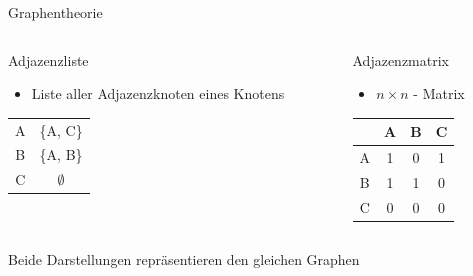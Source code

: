 \documentclass[aspectratio=169]{beamer}
\begin{document}
\begin{frame}{Graphentheorie}
    \vspace{0.5cm}
    \begin{columns}
        \begin{column}{0.5\textwidth}
            \centering \Large Adjazenzliste \normalsize
            \begin{itemize}
                \item Liste aller Adjazenzknoten eines Knotens
            \end{itemize}
            \begin{table}[]
                \centering
                \begin{tabular}{c|c}
                    A & \{A, C\} \\
                    B & \{A, B\} \\
                    C & $\emptyset$
                \end{tabular}
            \end{table}
        \end{column}
        \pause
        \vline
        \begin{column}{0.5\textwidth}
            \centering \Large Adjazenzmatrix \normalsize
            \begin{itemize}
                \item $n \times n$ - Matrix
            \end{itemize}
            \begin{table}[]
                \centering
                \begin{tabular}{c|c c c}
                     & A & B & C \\
                     \hline
                    A & 1 & 0 & 1 \\
                    B & 1 & 1 & 0 \\
                    C & 0 & 0 & 0 \\
                \end{tabular}
            \end{table}
        \end{column}
    \end{columns}
    \vspace{0.5cm}
    \pause
    \centering Beide Darstellungen repräsentieren den gleichen Graphen
\end{frame}
\end{document}
